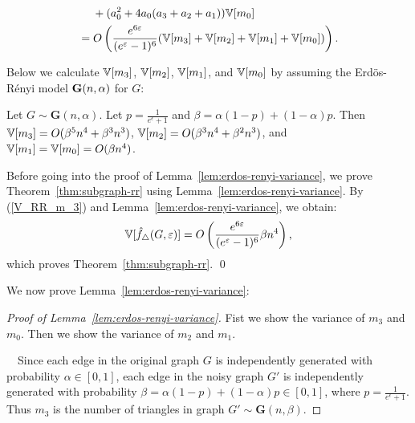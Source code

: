 {\begin{align}
    & \hspace{4.5mm} + (a_0^2 + 4a_0(a_3 + a_2 + a_1)) \mathbb{V}[m_0] \nonumber\\
    &= O\left( \frac{e^{6\varepsilon}}{(e^\varepsilon-1)^6} (\mathbb{V}[m_3] + \mathbb{V}[m_2] + \mathbb{V}[m_1] + \mathbb{V}[m_0]) \right).
    \label{V_RR_m_3}
\end{align}

Below we calculate $\mathbb{V}[m_3]$, $\mathbb{V}[m_2]$, $\mathbb{V}[m_1]$, and $\mathbb{V}[m_0]$ by assuming the Erd\"{o}s-R\'{e}nyi model $\mathbf{G}(n, \alpha)$ for $G$:

\begin{lemma}\label{lem:erdos-renyi-variance}
  Let $G \sim \textbf{G}(n,\alpha)$. 
  Let $p = \frac{1}{e^\epsilon+1}$ and 
  $\beta = \alpha(1-p) + (1-\alpha)p$. 
  Then $\mathbb{V}[m_3] = O(\beta^5 n^4 + \beta^3
  n^3)$, $\mathbb{V}[m_2] = O(\beta^3 n^4 + \beta^2 n^3)$, and 
  $\mathbb{V}[m_1] = \mathbb{V}[m_0] = O(\beta n^4)$.
\end{lemma}
Before going into the proof of Lemma~\ref{lem:erdos-renyi-variance}, we prove Theorem~\ref{thm:subgraph-rr} using Lemma~\ref{lem:erdos-renyi-variance}. 
By (\ref{V_RR_m_3}) and Lemma~\ref{lem:erdos-renyi-variance}, we obtain: 
\begin{align*}
\mathbb{V}[\hat{f}_{\triangle}(G, \varepsilon)] = O\left( \frac{e^{6\varepsilon}}{(e^\varepsilon-1)^6} \beta n^4 \right),
\end{align*}
which proves Theorem~\ref{thm:subgraph-rr}. \qed

We now prove Lemma~\ref{lem:erdos-renyi-variance}:

\begin{proof}[Proof of Lemma~\ref{lem:erdos-renyi-variance}]
Fist we show the variance of $m_3$ and $m_0$. 
Then we show the variance of $m_2$ and $m_1$.

\smallskip
{}~~Since each edge in the original graph $G$ is independently generated with probability $\alpha \in [0,1]$, each edge in the noisy graph $G'$ is independently generated with probability $\beta = \alpha (1-p) + (1 - \alpha) p \in [0,1]$, where $p=\frac{1}{e^\epsilon+1}$. 
Thus $m_3$ is the number of triangles in graph $G' \sim \textbf{G}(n,\beta)$.


\end{proof}}
